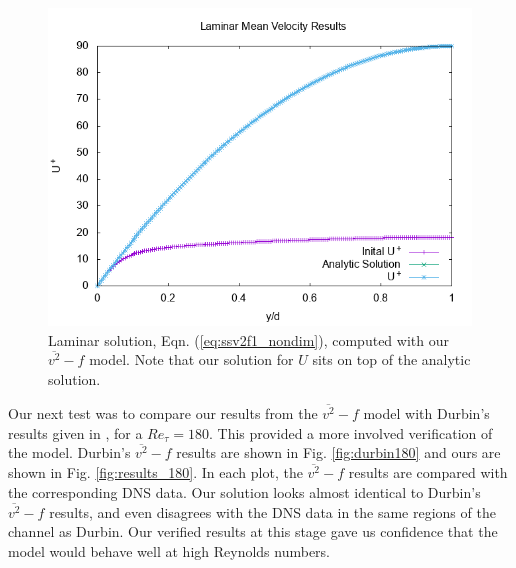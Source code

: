 \documentclass[a4paper,11pt]{article}
\begin{document}
\begin{figure}
 \centering
 \includegraphics[width=.7\textwidth]{laminar}
 \caption{Laminar solution, Eqn. (\ref{eq:ssv2f1_nondim}), computed with
our $\overline{v^2}-f$ model. Note that our solution for $U$ sits on top of the
analytic solution.}
 \label{fig:laminar}
\end{figure}


Our next test was to compare our results from the $\overline{v^2} - f$ model
with Durbin's results given in \cite{durbin180}, for a $Re_\tau = 180$. This provided a more involved
verification of the model. Durbin's $\overline{v^2}-f$ results are shown in Fig.
\ref{fig:durbin180} and ours are shown in Fig. \ref{fig:results_180}. In each
plot, the $\overline{v^2}-f$ results are compared with the corresponding DNS
data.  Our solution looks almost
identical to Durbin's $\overline{v^2}-f$ results, and even disagrees with the DNS
data in the same regions of the channel as Durbin. Our verified results at
this stage gave us confidence that the model would behave well at high Reynolds
numbers.

\end{document}
